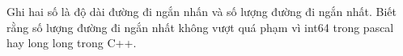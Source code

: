 Ghi hai số là độ dài đường đi ngắn nhấn và số lượng đường đi ngắn nhất. Biết rằng số lượng đường đi ngắn nhất không vượt quá phạm vì int64 trong pascal  hay long long trong C++.